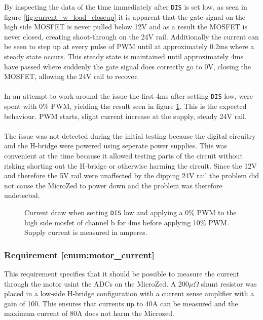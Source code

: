 By inspecting the data of the time immediately after \texttt{DIS} is set low, as seen in figure \ref{fig:current_w_load_closeup} it is apparent that the gate signal on the high side MOSFET is never pulled below 12V and as a result the MOSFET is never closed, creating shoot-through on the 24V rail.
Additionally the current can be seen to step up at every pulse of PWM until at approximately 0.2ms where a steady state occurs.
This steady state is maintained until approximately 4ms have passed where suddenly the gate signal does correctly go to 0V, closing the MOSFET, allowing the 24V rail to recover.
\\~\\
In an attempt to work around the issue the first 4ms after setting \texttt{DIS} low, were spent with 0\% PWM, yielding the result seen in figure \ref{fig:current_w_load_slow}.
This is the expected behaviour.
PWM starts, slight current increase at the supply, steady 24V rail.
\\~\\
The issue was not detected during the initial testing because the digital circuitry and the H-bridge were powered using seperate power supplies.
This was convenient at the time because it allowed testing parts of the circuit without risking shorting out the H-bridge or otherwise harming the circuit.
Since the 12V and therefore the 5V rail were unaffected by the dipping 24V rail the problem did not cause the MicroZed to power down and the problem was therefore undetected. 

\begin{figure}[h]
	\centering
	
	\caption{Current draw when setting \texttt{DIS} low and applying a 0\% PWM to the high side mosfet of channel b for 4ms before applying 10\% PWM. Supply current is measured in amperes.}
	\label{fig:current_w_load_slow}
\end{figure}

\subsubsection{Requirement \ref{enum:motor_current}} %
\label{ssub:requrement_enum:motor_current_}
This requirement specifies that it should be possible to measure the current through the motor usint the ADCs on the MicroZed.
A 200$\mu \Omega$ shunt resistor was placed in a low-side H-bridge configuration with a current sense amplifier with a gain of 100.
This ensures that currents up to 40A can be measured and the maximum current of 80A does not harm the Microzed.

